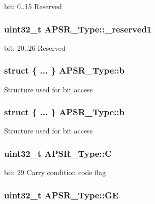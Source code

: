 bit\-: 0..15 Reserved \hypertarget{union_a_p_s_r___type_ac681f266e20b3b3591b961e13633ae13}{
\subsubsection[{\-\_\-reserved1}]{\setlength{\rightskip}{0pt plus 5cm}uint32\-\_\-t A\-P\-S\-R\-\_\-\-Type\-::\-\_\-reserved1}}\label{union_a_p_s_r___type_ac681f266e20b3b3591b961e13633ae13}
bit\-: 20..26 Reserved \hypertarget{union_a_p_s_r___type_a4de9553e1a179b9f95ed77b23e177951}{
\subsubsection[{b}]{\setlength{\rightskip}{0pt plus 5cm}struct \{ ... \}   A\-P\-S\-R\-\_\-\-Type\-::b}}\label{union_a_p_s_r___type_a4de9553e1a179b9f95ed77b23e177951}
Structure used for bit access \hypertarget{union_a_p_s_r___type_a250681ece58cf12233f316edea344e75}{
\subsubsection[{b}]{\setlength{\rightskip}{0pt plus 5cm}struct \{ ... \}   A\-P\-S\-R\-\_\-\-Type\-::b}}\label{union_a_p_s_r___type_a250681ece58cf12233f316edea344e75}
Structure used for bit access \hypertarget{union_a_p_s_r___type_a86e2c5b891ecef1ab55b1edac0da79a6}{
\subsubsection[{C}]{\setlength{\rightskip}{0pt plus 5cm}uint32\-\_\-t A\-P\-S\-R\-\_\-\-Type\-::\-C}}\label{union_a_p_s_r___type_a86e2c5b891ecef1ab55b1edac0da79a6}
bit\-: 29 Carry condition code flag \hypertarget{union_a_p_s_r___type_adcb98a5b9c93b0cb69cdb7af5638f32e}{
\subsubsection[{G\-E}]{\setlength{\rightskip}{0pt plus 5cm}uint32\-\_\-t A\-P\-S\-R\-\_\-\-Type\-::\-G\-E}}\label{union_a_p_s_r___type_adcb98a5b9c93b0cb69cdb7af5638f32e}
